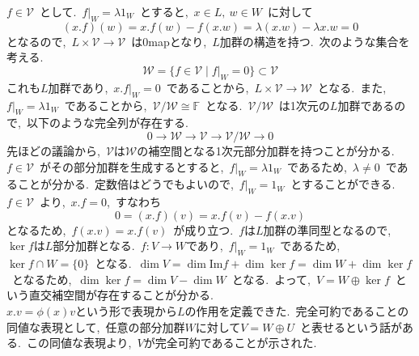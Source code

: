 \documentclass[uplatex,dvipdfmx]{jsarticle}
\begin{document}
\begin{myproof}
    $f \in \mathcal{V} $~として.~$f|_W = \lambda 1_W$~とすると,~$x\in L,~w \in W$~に対して
    \begin{equation*}
        (x.f)(w) = x.f(w) - f(x.w) = \lambda(x.w) - \lambda x.w = 0
    \end{equation*}
    となるので,~$L \times \mathcal{V} \to \mathcal{V}$~は$0$mapとなり,~$L$加群の構造を持つ.~次のような集合を考える.
    \begin{equation*}
        \mathcal{W} = \{ f \in \mathcal{V} \mid f|_W = 0 \} \subset \mathcal{V}
    \end{equation*}
    これも$L$加群であり,~$x.f|_W = 0$~であることから,~$L \times \mathcal{V} \to \mathcal{W}$~となる.~また,~$f|_W = \lambda 1_W$~であることから,~$\mathcal{V}/\mathcal{W} \cong \mathbb{F}$~となる.~$\mathcal{V}/\mathcal{W}$~は1次元の$L$加群であるので,~以下のような完全列が存在する.
    \begin{equation*}
        0 \to \mathcal{W} \to \mathcal{V} \to \mathcal{V}/\mathcal{W} \to 0
    \end{equation*}
    先ほどの議論から,~$\mathcal{V}$は$\mathcal{W}$の補空間となる1次元部分加群を持つことが分かる.~$f \in \mathcal{V}$~がその部分加群を生成するとすると,~$f|_W = \lambda 1_W$~であるため,~$\lambda \neq 0$~であることが分かる.~定数倍はどうでもよいので,~$f|_W = 1_W$~とすることができる.\\
    $f\in \mathcal{V}$~より,~$x.f = 0$,~すなわち
    \begin{equation*}
        0 = (x.f)(v) = x.f(v) - f(x.v)
    \end{equation*}
    となるため,~$f(x.v) = x.f(v)$~が成り立つ.~$f$は$L$加群の準同型となるので,~$\ker f$は$L$部分加群となる.~$f:V\to W $であり,~$f|_W = 1_W$~であるため,~$\ker f \cap W = \{0\}$~となる.~$\dim V = \dim \text{Im} f + \dim \ker f = \dim W + \dim \ker f$~となるため,~$\dim \ker f = \dim V - \dim W$~となる.~よって,~$V = W \oplus \ker f$~という直交補空間が存在することが分かる.\\
    $x.v = \phi(x)v$という形で表現から$L$の作用を定義できた.~完全可約であることの同値な表現として,~任意の部分加群$W$に対して$V= W \oplus U$~と表せるという話がある.~この同値な表現より,~$V$が完全可約であることが示された.\\
\end{myproof}
\newpage
\end{document}
